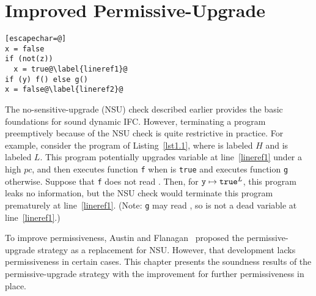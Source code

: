 \chapter{Improved Permissive-Upgrade}
\label{ch:ipu}

\begin{lstlisting}[float,label=lst1.1,caption=Impermissiveness of the NSU strategy][escapechar=@]
x = false
if (not(z))
  x = true@\label{lineref1}@
if (y) f() else g()
x = false@\label{lineref2}@
\end{lstlisting}
%
The no-sensitive-upgrade (NSU) check described earlier provides the basic
foundations for sound dynamic IFC. However, terminating a program
preemptively because of the NSU check is quite restrictive in practice. For
example, consider the program of Listing~\ref{lst1.1}, where  is
labeled $H$ and  is labeled $L$. This program potentially upgrades
variable  at line~\ref{lineref1} under a high $pc$, and then
executes function \texttt{f} when  is \texttt{true} and
executes function \texttt{g} otherwise. Suppose that \texttt{f}
does not read . Then, for $\texttt{y} \mapsto \texttt{true}^L$, this program
leaks no information, but the NSU check would terminate this program
prematurely at line~\ref{lineref1}. (Note: \texttt{g} may read ,
so  is not a dead variable at line~\ref{lineref1}.)

To improve permissiveness, Austin and Flanagan~\cite{plas10} proposed
the permissive-upgrade strategy as a replacement for NSU. However,
that development lacks permissiveness in certain cases. 
This chapter presents the soundness results of the permissive-upgrade
strategy with the improvement for further permissiveness in place.




% 

